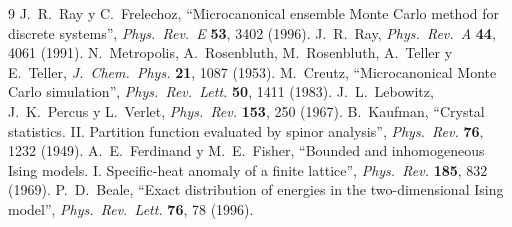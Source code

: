 \documentclass[11pt,letterpaper]{article}
\begin{document}
\begin{thebibliography}{9}
 J.~R.~Ray y C.~Frelechoz, ``Microcanonical ensemble Monte Carlo method
for discrete systems'', \textit{Phys.\ Rev.\ E} \textbf{53}, 3402 (1996).
 J.~R.~Ray, \textit{Phys.\ Rev.\ A} \textbf{44}, 4061 (1991).
 N.~Metropolis, A.~Rosenbluth, M.~Rosenbluth, A.~Teller y
E.~Teller, \textit{J.\ Chem.\ Phys.} \textbf{21}, 1087 (1953).
 M.~Creutz, ``Microcanonical Monte Carlo simulation'',
\textit{Phys.\ Rev.\ Lett.} \textbf{50}, 1411 (1983).
 J.~L.~Lebowitz, J.~K.~Percus y L.~Verlet, \textit{Phys.\ Rev.}
\textbf{153}, 250 (1967).
 B.~Kaufman, ``Crystal statistics. II. Partition function evaluated
by spinor analysis'', \textit{Phys.\ Rev.} \textbf{76}, 1232 (1949).
 A.~E.~Ferdinand y M.~E.~Fisher, ``Bounded and inhomogeneous Ising
models. I. Specific-heat anomaly of a finite lattice'', \textit{Phys.\ Rev.}
\textbf{185}, 832 (1969).
 P.~D.~Beale, ``Exact distribution of energies in the two-dimensional
Ising model'', \textit{Phys.\ Rev.\ Lett.} \textbf{76}, 78 (1996).
\end{thebibliography}
\end{document}
